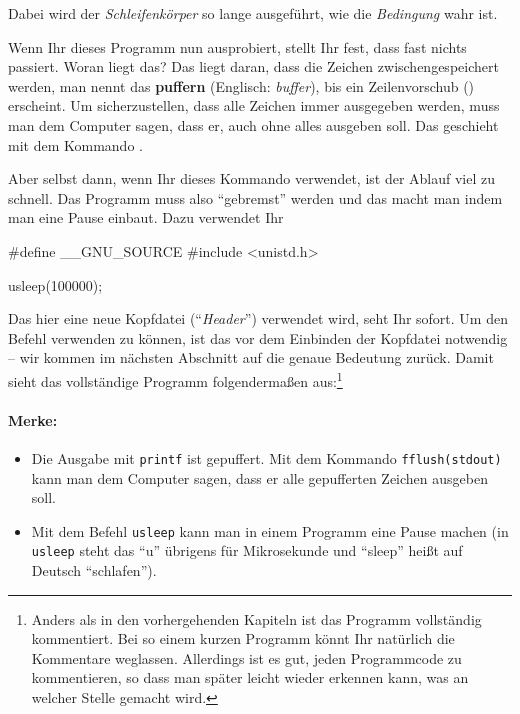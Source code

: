 \noindent
Dabei wird der \emph{Schleifenkörper} so lange ausgeführt, wie die \emph{Bedingung} wahr ist.

Wenn Ihr dieses Programm nun ausprobiert, stellt Ihr fest, dass fast nichts passiert. Woran liegt das? Das liegt daran, dass die Zeichen zwischengespeichert werden, man nennt das \textbf{puffern} (Englisch: \emph{buffer}), bis ein Zeilenvorschub () erscheint. Um sicherzustellen, dass alle Zeichen immer ausgegeben werden, muss man dem Computer sagen, dass er, auch ohne  alles ausgeben soll. Das geschieht mit dem Kommando .

Aber selbst dann, wenn Ihr dieses Kommando verwendet, ist der Ablauf viel zu schnell. Das Programm muss also ``gebremst'' werden und das macht man indem man eine Pause einbaut. Dazu verwendet Ihr
\begin{code}
#define __GNU_SOURCE
#include <unistd.h>

usleep(100000);
\end{code}
Das hier eine neue Kopfdatei (``\emph{Header}'') verwendet wird, seht Ihr sofort. Um den Befehl  verwenden zu können, ist das  vor dem Einbinden der Kopfdatei notwendig -- wir kommen im nächsten Abschnitt auf die genaue Bedeutung zurück.
Damit sieht das vollständige Programm folgendermaßen aus:\footnote{%
    Anders als in den vorhergehenden Kapiteln ist das Programm vollständig kommentiert. Bei so einem kurzen Programm könnt Ihr natürlich die Kommentare weglassen. Allerdings ist es gut, jeden Programmcode zu kommentieren, so dass man später leicht wieder erkennen kann, was an welcher Stelle gemacht wird.}

\label{sec:c:lauflicht:program}

\paragraph{Merke:}

\begin{itemize}[noitemsep]
    \item Die Ausgabe mit \texttt{printf} ist gepuffert. Mit dem Kommando \texttt{fflush(stdout)} kann man dem Computer sagen, dass er alle gepufferten Zeichen ausgeben soll.
    \item Mit dem Befehl \texttt{usleep} kann man in einem Programm eine Pause machen (in \texttt{usleep} steht das ``u'' übrigens für Mikrosekunde und ``sleep'' heißt auf Deutsch ``schlafen'').
\end{itemize}
